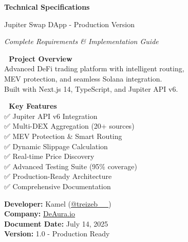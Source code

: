 \documentclass[12pt,a4paper]{article}
\begin{document}
\begin{titlepage}
    \centering
    \vspace*{1cm}
    
    {\Huge\textbf{\textcolor{jupiterBlue}{Technical Specifications}}\par}
    \vspace{0.5cm}
    {\LARGE\textcolor{deauraPurple}{Jupiter Swap DApp - Production Version}\par}
    \vspace{0.3cm}
    {\Large\textit{Complete Requirements \& Implementation Guide}\par}
    
    \vspace{1.5cm}
    
    \begin{tcolorbox}[colback=jupiterBlue!10,colframe=jupiterBlue,width=0.9\textwidth]
        \centering
        \textbf{🚀 Project Overview}\\
        \vspace{0.5cm}
        Advanced DeFi trading platform with intelligent routing,\\
        MEV protection, and seamless Solana integration.\\
        Built with Next.js 14, TypeScript, and Jupiter API v6.
    \end{tcolorbox}
    
    \vspace{1.5cm}
    
    \begin{tcolorbox}[colback=successGreen!10,colframe=successGreen,width=0.8\textwidth]
        \centering
        \textbf{🎯 Key Features}\\
        \vspace{0.3cm}
        ✅ Jupiter API v6 Integration\\
        ✅ Multi-DEX Aggregation (20+ sources)\\
        ✅ MEV Protection \& Smart Routing\\
        ✅ Dynamic Slippage Calculation\\
        ✅ Real-time Price Discovery\\
        ✅ Advanced Testing Suite (95\% coverage)\\
        ✅ Production-Ready Architecture\\
        ✅ Comprehensive Documentation
    \end{tcolorbox}
    
    \vfill
    
    {\large\textbf{Developer:} Kamel (\href{https://x.com/treizeb__}{@treizeb\_\_})\\
    \textbf{Company:} \href{https://deaura.io}{DeAura.io}\\
    \textbf{Document Date:} July 14, 2025\\
    \textbf{Version:} 1.0 - Production Ready\par}
\end{titlepage}
\end{document}
